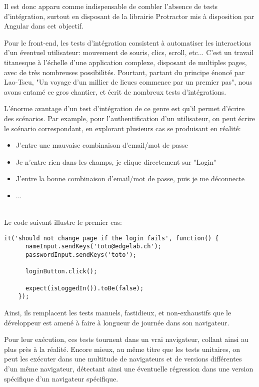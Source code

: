 \documentclass[a4paper,french,12pt]{article}
\begin{document}
	Il est donc apparu comme indispensable de combler l'absence de tests d'intégration, surtout en disposant de la librairie Protractor mis à disposition par Angular dans cet objectif.
	
	Pour le front-end, les tests d'intégration consistent à automatiser les interactions d'un éventuel utilisateur: mouvement de souris, clics, scroll, etc... C'est un travail titanesque à l'échelle d'une application complexe, disposant de multiples pages, avec de très nombreuses possibilités.
	Pourtant, partant du principe énoncé par Lao-Tseu, "Un voyage d'un millier de lieues commence par un premier pas", nous avons entamé ce gros chantier, et écrit de nombreux tests d'intégrations.
	
	L'énorme avantage d'un test d'intégration de ce genre est qu'il permet d'écrire des scénarios. Par example, pour l'authentification d'un utilisateur, on peut écrire le scénario correspondant, en explorant plusieurs cas se produisant en réalité:

	\begin{itemize}
		\item J'entre une mauvaise combinaison d'email/mot de passe
		\item Je n'entre rien dans les champs, je clique directement sur "Login"
		\item J'entre la bonne combinaison d'email/mot de passe, puis je me déconnecte
		\item ...
	\end{itemize} ~\\
	
	Le code suivant illustre le premier cas: ~\\
	
	\begin{lstlisting}[caption=Testing the login with Protractor]
	it('should not change page if the login fails', function() {
      nameInput.sendKeys('toto@edgelab.ch');
      passwordInput.sendKeys('toto');

      loginButton.click();

      expect(isLoggedIn()).toBe(false);
    });
	\end{lstlisting}
		
		
	Ainsi, ils remplacent les tests manuels, fastidieux, et non-exhaustifs que le développeur est amené à faire à longueur de journée dans son navigateur.
	
	Pour leur exécution, ces tests tournent dans un vrai navigateur, collant ainsi au plus près à la réalité. Encore mieux, au même titre que les tests unitaires, on peut les exécuter dans une multitude de navigateurs et de versions différentes d'un même navigateur, détectant ainsi une éventuelle régression dans une version spécifique d'un navigateur spécifique.
	
\end{document}
